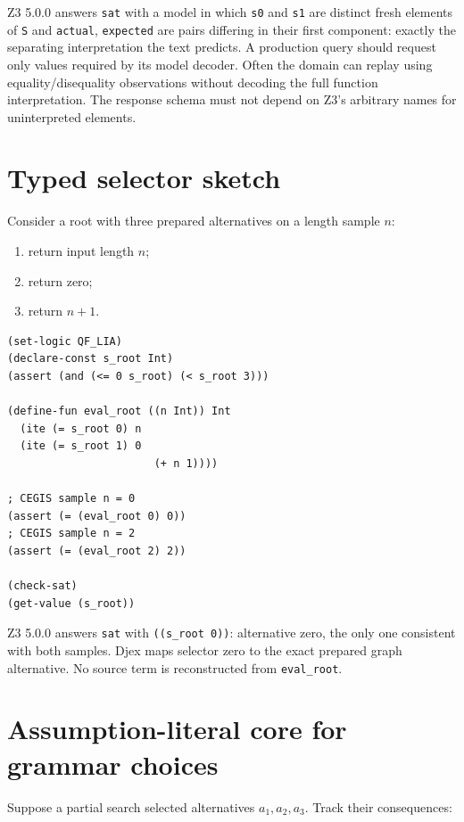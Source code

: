 \documentclass[11pt,oneside]{report}
\newcommand{\code}[1]{\texttt{#1}}
\begin{document}
Z3 5.0.0 answers \texttt{sat} with a model in which \code{s0} and \code{s1} are distinct fresh elements of \code{S} and \code{actual}, \code{expected} are pairs differing in their first component: exactly the separating interpretation the text predicts. A production query should request only values required by its model decoder. Often the domain can replay using equality/disequality observations without decoding the full function interpretation. The response schema must not depend on Z3's arbitrary names for uninterpreted elements.

\section{Typed selector sketch}

Consider a root with three prepared alternatives on a length sample $n$:

\begin{enumerate}[leftmargin=2em]
\item return input length $n$;
\item return zero;
\item return $n+1$.
\end{enumerate}

\begin{lstlisting}[language=SMTLIB,caption={Finite selector sketch on accumulated samples.},label={lst:smt-sketch}]
(set-logic QF_LIA)
(declare-const s_root Int)
(assert (and (<= 0 s_root) (< s_root 3)))

(define-fun eval_root ((n Int)) Int
  (ite (= s_root 0) n
  (ite (= s_root 1) 0
                       (+ n 1))))

; CEGIS sample n = 0
(assert (= (eval_root 0) 0))
; CEGIS sample n = 2
(assert (= (eval_root 2) 2))

(check-sat)
(get-value (s_root))
\end{lstlisting}

Z3 5.0.0 answers \texttt{sat} with \code{((s\_root 0))}: alternative zero, the only one consistent with both samples. Djex maps selector zero to the exact prepared graph alternative. No source term is reconstructed from \code{eval\_root}.

\section{Assumption-literal core for grammar choices}

Suppose a partial search selected alternatives $a_1,a_2,a_3$. Track their consequences:
\end{document}

